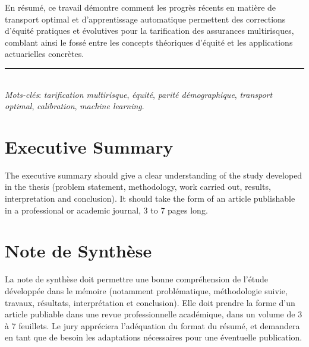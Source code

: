 \documentclass[
  a4paper,
  11pt,
  a4paper,
  twoside,
  openright]{report}
\begin{document}
En résumé, ce travail démontre comment les progrès récents en matière de
transport optimal et d'apprentissage automatique permettent des
corrections d'équité pratiques et évolutives pour la tarification des
assurances multirisques, comblant ainsi le fossé entre les concepts
théoriques d'équité et les applications actuarielles concrètes.

\noindent\rule{\textwidth}{0.4pt}\\[0.6em]

\emph{Mots-clés}: \emph{tarification multirisque}, \emph{équité},
\emph{parité démographique}, \emph{transport optimal},
\emph{calibration}, \emph{machine learning}.



\chapter*{Executive Summary}\label{executive-summary}


The executive summary should give a clear understanding of the study
developed in the thesis (problem statement, methodology, work carried
out, results, interpretation and conclusion). It should take the form of
an article publishable in a professional or academic journal, 3 to 7
pages long.


\chapter*{Note de Synthèse}\label{note-de-synthuxe8se}


La note de synthèse doit permettre une bonne compréhension de l'étude
développée dans le mémoire (notamment problématique, méthodologie
suivie, travaux, résultats, interprétation et conclusion). Elle doit
prendre la forme d'un article publiable dans une revue professionnelle
académique, dans un volume de 3 à 7 feuillets. Le jury appréciera
l'adéquation du format du résumé, et demandera en tant que de besoin les
adaptations nécessaires pour une éventuelle publication.

\end{document}
